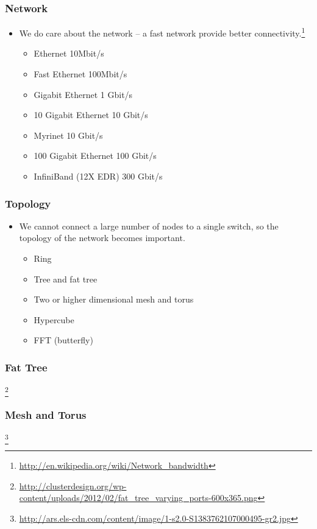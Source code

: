 \documentclass{beamer}
\begin{document}
\begin{CJK}{UTF8}{bsmi}
\begin{frame}
\frametitle{Network}
\begin{itemize}
\item We do care about the network -- a fast network provide better
  connectivity.\footnote{\url{http://en.wikipedia.org/wiki/Network_bandwidth}}
\begin{itemize}
\item Ethernet 10Mbit/s
\item Fast Ethernet 100Mbit/s
\item Gigabit Ethernet 1 Gbit/s
\item 10 Gigabit Ethernet 10  Gbit/s
\item Myrinet 10 Gbit/s
\item 100 Gigabit Ethernet 100 Gbit/s
\item InfiniBand (12X EDR) 300 Gbit/s
\end{itemize}

\end{itemize}
\end{frame}

\begin{frame}
\frametitle{Topology}
\begin{itemize}
\item We cannot connect a large number of nodes to a single switch, so
  the topology of the network becomes important.
\begin{itemize}
\item Ring
\item Tree and fat tree
\item Two or higher dimensional mesh and torus
\item Hypercube
\item FFT (butterfly)
\end{itemize}
\end{itemize}
\end{frame}

\begin{frame}
\frametitle{Fat Tree}
\centerline{}
\footnote{\url{http://clusterdesign.org/wp-content/uploads/2012/02/fat_tree_varying_ports-600x365.png}}
\end{frame}

\begin{frame}
\frametitle{Mesh and Torus}
\centerline{}
\footnote{\url{http://ars.els-cdn.com/content/image/1-s2.0-S1383762107000495-gr2.jpg}}
\end{frame}


\end{CJK}
\end{document}
